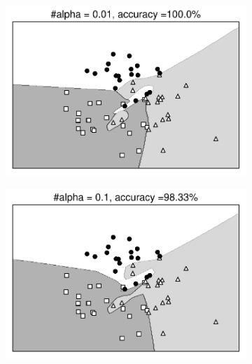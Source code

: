\begin{figure}[t]
\begin{subfigure}{0.45\textwidth}
\includegraphics[width=0.99\linewidth]{ebookML_src/src/mlp/nn_overfitting_001.pdf}
\caption{}
\end{subfigure}
\begin{subfigure}{0.45\textwidth}
\includegraphics[width=0.99\linewidth]{ebookML_src/src/mlp/nn_overfitting_01.pdf}
\caption{}
\end{subfigure}


\end{figure}
